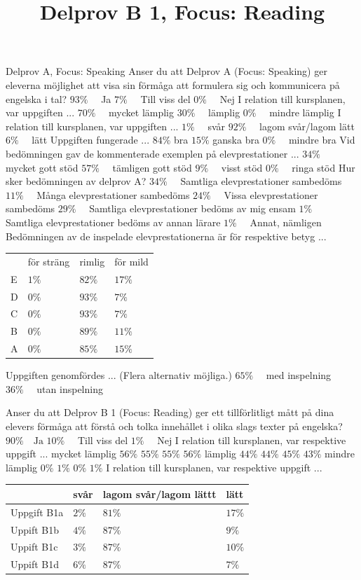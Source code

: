 Delprov A, Focus: Speaking
Anser du att Delprov A (Focus: Speaking) ger eleverna möjlighet att visa sin förmåga att formulera sig och kommunicera på engelska i tal?
\(93 \% \quad\) Ja
\(7 \% \quad\) Till viss del
\(0 \% \quad\) Nej
I relation till kursplanen, var uppgiften ...
\(70 \% \quad\) mycket lämplig
\(30 \% \quad\) lämplig
\(0 \% \quad\) mindre lämplig
I relation till kursplanen, var uppgiften ...
\(1 \% \quad\) svår
\(92 \% \quad\) lagom svår/lagom lätt
\(6 \% \quad\) lätt
Uppgiften fungerade ...
\(84 \%\) bra
\(15 \%\) ganska bra
\(0 \% \quad\) mindre bra
Vid bedömningen gav de kommenterade exemplen på elevprestationer ...
\(34 \% \quad\) mycket gott stöd
\(57 \% \quad\) tämligen gott stöd
\(9 \% \quad\) visst stöd
\(0 \% \quad\) ringa stöd
Hur sker bedömningen av delprov A?
\(34 \% \quad\) Samtliga elevprestationer sambedöms
\(11 \% \quad\) Många elevprestationer sambedöms
\(24 \% \quad\) Vissa elevprestationer sambedöms
\(29 \% \quad\) Samtliga elevprestationer bedöms av mig ensam
\(1 \% \quad\) Samtliga elevprestationer bedöms av annan lärare
\(1 \% \quad\) Annat, nämligen
Bedömningen av de inspelade elevprestationerna är för respektive betyg ...
\begin{tabular}{llll} 
& för sträng & rimlig & för mild \\
E & \(1 \%\) & \(82 \%\) & \(17 \%\) \\
D & \(0 \%\) & \(93 \%\) & \(7 \%\) \\
C & \(0 \%\) & \(93 \%\) & \(7 \%\) \\
B & \(0 \%\) & \(89 \%\) & \(11 \%\) \\
A & \(0 \%\) & \(85 \%\) & \(15 \%\)
\end{tabular}
Uppgiften genomfördes ... (Flera alternativ möjliga.)
\(65 \% \quad\) med inspelning
\(36 \% \quad\) utan inspelning

\title{
Delprov B 1, Focus: Reading
}
Anser du att Delprov B 1 (Focus: Reading) ger ett tillförlitligt mått på dina elevers förmåga att förstå och tolka innehållet i olika slags texter på engelska?
\(90 \% \quad \mathrm{Ja}\)
\(10 \% \quad\) Till viss del
\(1 \% \quad\) Nej
I relation till kursplanen, var respektive uppgift ...
mycket lämplig
\(56 \%\)
\(55 \%\)
\(55 \%\)
\(56 \%\)
lämplig
\(44 \%\)
\(44 \%\)
\(45 \%\)
\(43 \%\)
mindre lämplig
\(0 \%\)
\(1 \%\)
\(0 \%\)
\(1 \%\)
I relation till kursplanen, var respektive uppgift ...
\begin{tabular}{l|l|l|l} 
& svår & lagom svår/lagom lättt & lätt \\
\hline Uppgift B1a & \(2 \%\) & \(81 \%\) & \(17 \%\) \\
\hline Uppift B1b & \(4 \%\) & \(87 \%\) & \(9 \%\) \\
\hline Uppift B1c & \(3 \%\) & \(87 \%\) & \(10 \%\) \\
\hline Uppift B1d & \(6 \%\) & \(87 \%\) & \(7 \%\)
\end{tabular}
